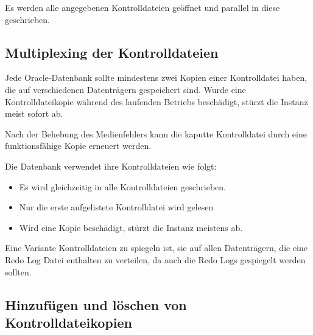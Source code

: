         \begin{merke}
          Es werden alle angegebenen Kontrolldateien geöffnet und parallel in diese geschrieben.
        \end{merke}
\clearpage		
      \subsection{Multiplexing der Kontrolldateien}
        Jede Oracle-Datenbank sollte mindestens zwei Kopien einer Kontrolldatei
        haben, die auf verschiedenen Datenträgern gespeichert sind.
        Wurde eine Kontrolldateikopie während des laufenden Betriebs
        beschädigt, stürzt die Instanz meist sofort ab.

        Nach der Behebung des Medienfehlers kann die kaputte Kontrolldatei durch eine funktionsfähige Kopie erneuert werden.

        Die Datenbank verwendet ihre Kontrolldateien wie folgt:
        \begin{itemize}
          \item Es wird gleichzeitig in alle Kontrolldateien geschrieben.
          \item Nur die erste aufgelistete Kontrolldatei wird gelesen
          \item Wird eine Kopie beschädigt, stürzt die Instanz meistens ab.
        \end{itemize}
        Eine Variante Kontrolldateien zu spiegeln ist, sie auf allen Datenträgern, die eine Redo Log Datei enthalten zu verteilen, da auch die Redo Logs gespiegelt werden sollten.
      \subsection{Hinzufügen und löschen von Kontrolldateikopien}
